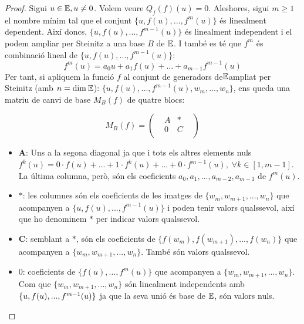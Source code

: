 \begin{proof}

Sigui $u \in \mathbb{E}, u \neq 0$. Volem veure $Q_f(f)(u) = 0$. Aleshores, sigui $m\geq 1$ el nombre mínim tal que el conjunt $\{u,f(u),...,f^m(u)\}$ és linealment dependent. Així doncs, $\{u,f(u),...,f^{m-1}(u)\}$ és linealment independent i el podem ampliar per Steinitz a una base $B$ de $\mathbb{E}$. I també es té que $f^m$ és combinació lineal de $\{u,f(u),...,f^{m-1}(u)\}$:
$$ f^m(u) = a_0u + a_1f(u) + ... + a_{m-1}f^{m-1}(u) $$
Per tant, si apliquem la funció $f$ al conjunt de generadors de$\mathbb{E}$ampliat per Steinitz (amb $n = \text{dim}\:\mathbb{E}$): $\{u,f(u),...,f^{m-1}(u), w_{m},...,w_n\}$, ens queda una matriu de canvi de base $M_B(f)$ de quatre blocs:

\[ M_B(f) = 
\begin{pmatrix}
    &A &*  &\\
    &0  &C &\\
\end{pmatrix}
\]

\begin{itemize}
    \item \textbf{A}: Uns a la segona diagonal ja que i tots els altres elements nuls $f^k(u) = 0\cdot f(u) + ... + 1\cdot f^k(u) + ... + 0\cdot f^{m-1}(u), \; \forall k \in [1,m-1] $. La última columna, però, són els coeficients $a_0,a_1,...,a_{m-2},a_{m-1}$ de $f^m(u)$.
    
    \item $\mathbf{*}$: les columnes són els coeficients de les imatges de $\{w_{m}, w_{m+1}, ..., w_{n}\}$ que acompanyen a $\{u,f(u),...,f^{m-1}(u)\}$ i poden tenir valors qualssevol, així que ho denominem $\mathbf{*}$ per indicar valors qualssevol.
    
    \item \textbf{C}: semblant a $\mathbf{*}$, són els coeficients de $\{f(w_{m}), f(w_{m+1}), ..., f(w_{n})\}$ que acompanyen a $\{w_{m}, w_{m+1}, ..., w_{n}\}$. També són valors qualssevol.
    
    \item $0$: coeficients de $\{f(u),...,f^{m}(u)\}$ que acompanyen a $\{w_{m}, w_{m+1}, ..., w_{n}\}$. Com que $\{w_{m}, w_{m+1}, ..., w_{n}\}$ són linealment independents amb $\{u,f(u), ...,\\ f^{m-1}(u)\}$ ja que la seva unió és base de $\mathbb{E}$, són valors nuls.
\end{itemize}


\end{proof}
